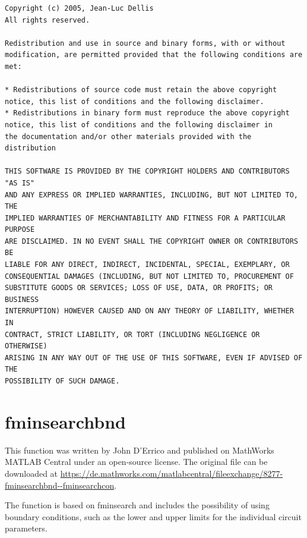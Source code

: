 \documentclass[9pt,a4paper,oneside]{book}
\begin{document}
\begin{small}
\begin{verbatim}
Copyright (c) 2005, Jean-Luc Dellis
All rights reserved.

Redistribution and use in source and binary forms, with or without
modification, are permitted provided that the following conditions are
met:

* Redistributions of source code must retain the above copyright
notice, this list of conditions and the following disclaimer.
* Redistributions in binary form must reproduce the above copyright
notice, this list of conditions and the following disclaimer in
the documentation and/or other materials provided with the distribution

THIS SOFTWARE IS PROVIDED BY THE COPYRIGHT HOLDERS AND CONTRIBUTORS "AS IS"
AND ANY EXPRESS OR IMPLIED WARRANTIES, INCLUDING, BUT NOT LIMITED TO, THE
IMPLIED WARRANTIES OF MERCHANTABILITY AND FITNESS FOR A PARTICULAR PURPOSE
ARE DISCLAIMED. IN NO EVENT SHALL THE COPYRIGHT OWNER OR CONTRIBUTORS BE
LIABLE FOR ANY DIRECT, INDIRECT, INCIDENTAL, SPECIAL, EXEMPLARY, OR
CONSEQUENTIAL DAMAGES (INCLUDING, BUT NOT LIMITED TO, PROCUREMENT OF
SUBSTITUTE GOODS OR SERVICES; LOSS OF USE, DATA, OR PROFITS; OR BUSINESS
INTERRUPTION) HOWEVER CAUSED AND ON ANY THEORY OF LIABILITY, WHETHER IN
CONTRACT, STRICT LIABILITY, OR TORT (INCLUDING NEGLIGENCE OR OTHERWISE)
ARISING IN ANY WAY OUT OF THE USE OF THIS SOFTWARE, EVEN IF ADVISED OF THE
POSSIBILITY OF SUCH DAMAGE.
\end{verbatim}
\end{small}


\section{fminsearchbnd}

This function was written by John D'Errico and published on MathWorks MATLAB Central under an open-source license. The original file can be downloaded at \url{https://de.mathworks.com/matlabcentral/fileexchange/8277-fminsearchbnd--fminsearchcon}.

The function is based on fminsearch and includes the possibility of using boundary conditions, such as the lower and upper limits for the individual circuit parameters.
\end{document}
